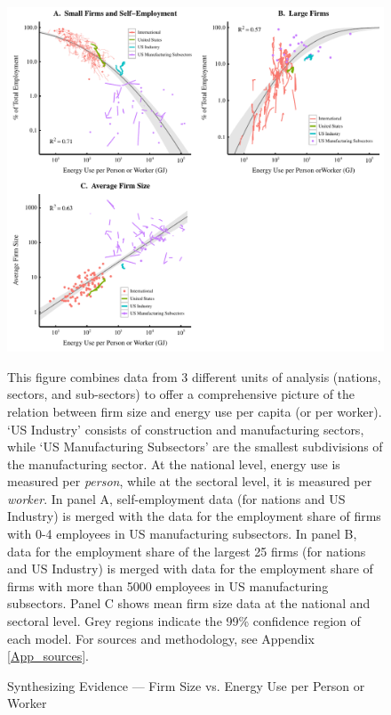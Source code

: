 \begin{figure}
	
	\centerline{\includegraphics[scale=1]{Fig3}}
	
	\caption{Synthesizing Evidence --- Firm Size vs. Energy Use per Person or Worker\label{Fig_E_Aggregate}}
	
	\small
	\smallskip
	
	This figure combines data from 3 different units of analysis (nations, sectors, and sub-sectors) to offer a comprehensive picture of the relation between firm size and energy use per capita (or per worker). `US Industry' consists of construction and manufacturing sectors, while  `US Manufacturing Subsectors' are the smallest subdivisions of the manufacturing sector. At the national level, energy use is measured per \textit{person}, while at the sectoral level, it is measured per \textit{worker}. In panel A, self-employment data (for nations and US Industry) is merged with the data for the employment share of firms with 0-4 employees in US manufacturing subsectors. In panel B, data for the employment share of the largest 25 firms (for nations and US Industry) is merged with data for the employment share of firms with more than 5000 employees in US manufacturing subsectors. Panel C shows mean firm size data at the national and sectoral level.  Grey regions indicate the 99\% confidence region of each model. For sources and methodology, see Appendix \ref{App_sources}.
	
\end{figure}




